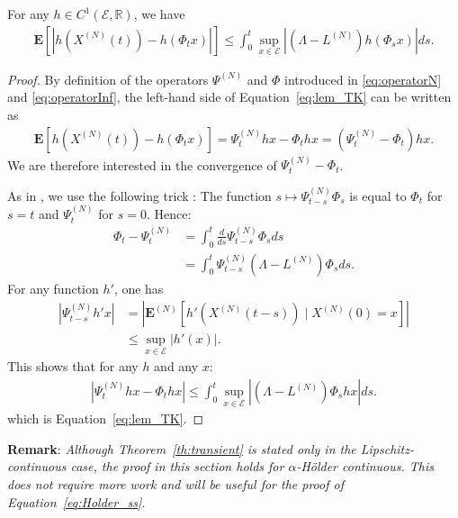 \documentclass[sigconf]{acmart}
\newcommand\XN{X^{(N)}}
\newcommand\LN{L^{(N)}}
\newcommand\PsiN{\Psi^{(N)}}
\newcommand\E{\mathcal{E}}
\newcommand\R{\mathbb{R}}
\newcommand\esp[1]{\mathbf{E}\left[#1\right]}
\newcommand\espN[1]{\mathbf{E}^{(N)}\left[#1\right]}
\newcommand\abs[1]{\left|#1\right|}
\begin{document}
\begin{lemma}
  \label{lem:trotter-kurtz}
  For any $h\in C^{1}(\E,\R)$, we have
  \begin{align}
    \esp{\abs{h(\XN(t))-h(\Phi_tx)}} \le
    \int_0^t\sup_{x\in\E}|(\Lambda-\LN)h(\Phi_sx)|ds.
    \label{eq:lem_TK}
  \end{align}
\end{lemma}
\begin{proof}
  By definition of the operators $\PsiN$ and $\Phi$ introduced in
  \eqref{eq:operatorN} and \eqref{eq:operatorInf}, the left-hand side
  of Equation~\eqref{eq:lem_TK} can be written as
  \begin{align*}
    \esp{h(\XN(t))-h(\Phi_tx)} = \PsiN_thx-\Phi_thx =
    (\PsiN_t-\Phi_t)hx. 
  \end{align*}
  We are therefore interested in the convergence of
  $\PsiN_t-\Phi_t$. 

  As in \cite[Theorem~1]{kolokoltsov2011mean}, we use the following
  trick : The function $s\mapsto\PsiN_{t-s}\Phi_s$ is equal to
  $\Phi_t$ for $s=t$ and $\PsiN_t$ for $s=0$.  Hence:
  \begin{align}
    \Phi_t - \PsiN_t  &= \int_0^t \frac{d}{ds} \PsiN_{t-s}\Phi_s ds\nonumber\\
                       &=\int_0^t \PsiN_{t-s}(\Lambda-\LN)\Phi_sds. 
  \end{align}
  For any function $h'$, one has
  \begin{align*}
    \abs{\PsiN_{t-s}h'x} &= \abs{\espN{h'(\XN(t-s))\mid \XN(0)=x}} \\
                        &\le\sup_{x\in\E} \abs{h'(x)}. 
  \end{align*}
  This shows that for any $h$ and any $x$: 
  \begin{align*}
    \abs{\PsiN_thx -  \Phi_thx} \le \int_0^t\sup_{x\in\E}
    \abs{(\Lambda-\LN)\Phi_shx}ds.
  \end{align*}
  which is Equation~\eqref{eq:lem_TK}. 
  \end{proof}


\textbf{Remark}: \emph{ Although Theorem~\ref{th:transient} is stated
  only in the Lipschitz-continuous case, the proof in this section
  holds for $\alpha$-Hölder continuous. This does not require more
  work and will be useful for the proof of
  Equation~\eqref{eq:Holder_ss}.}
\end{document}
